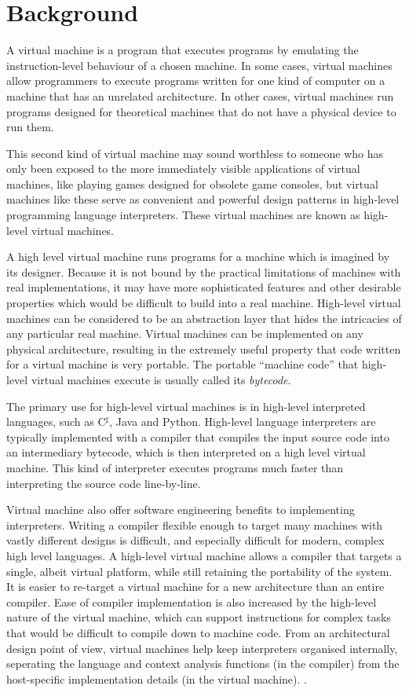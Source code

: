 	\section{Background}
		A virtual machine is a program that executes programs by emulating the instruction-level behaviour of a chosen machine. In some cases, virtual machines allow programmers to execute programs written for one kind of computer on a machine that has an unrelated architecture. In other cases, virtual machines run programs designed for theoretical machines that do not have a physical device to run them.
		
		This second kind of virtual machine may sound worthless to someone who has only been exposed to the more immediately visible applications of virtual machines, like playing games designed for obsolete game consoles, but virtual machines like these serve as convenient and powerful design patterns in high-level programming language interpreters. These virtual machines are known as high-level virtual machines.
		
		A high level virtual machine runs programs for a machine which is imagined by its designer. Because it is not bound by the practical limitations of machines with real implementations, it may have more sophisticated features and other desirable properties which would be difficult to build into a real machine. High-level virtual machines can be considered to be an abstraction layer that hides the intricacies of any particular real machine. Virtual machines can be implemented on any physical architecture, resulting in the extremely useful property that code written for a virtual machine is very portable. The portable ``machine code'' that high-level virtual machines execute is usually called its \emph{bytecode}. 
		
		The primary use for high-level virtual machines is in high-level interpreted languages, such as C$^\sharp$, Java and Python. High-level language interpreters are typically implemented with a compiler that compiles the input source code into an intermediary bytecode, which is then interpreted on a high level virtual machine. This kind of interpreter executes programs much faster than interpreting the source code line-by-line.
		
		Virtual machine also offer software engineering benefits to implementing interpreters. Writing a compiler flexible enough to target many machines with vastly different designs is difficult, and especially difficult for modern, complex high level languages. A high-level virtual machine allows a compiler that targets a single, albeit virtual platform, while still retaining the portability of the system. It is easier to re-target a virtual machine for a new architecture than an entire compiler. Ease of compiler implementation is also increased by the high-level nature of the virtual machine, which can support instructions for complex tasks that would be difficult to compile down to machine code. From an architectural design point of view, virtual machines help keep interpreters organised internally, seperating the language and context analysis functions (in the compiler) from the host-specific implementation details (in the virtual machine). \citep{structureinterpreters}.
		
